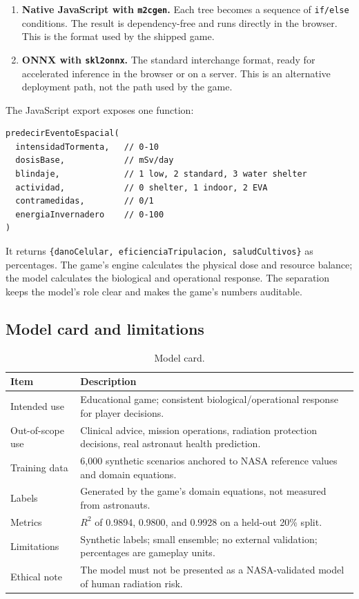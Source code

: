 \documentclass[11pt,a4paper]{article}
\newcommand{\code}[1]{\texttt{#1}}
\begin{document}
\begin{enumerate}
  \item \textbf{Native JavaScript with \code{m2cgen}.} Each tree becomes a sequence of \code{if/else} conditions. The result is dependency-free and runs directly in the browser. This is the format used by the shipped game.
  \item \textbf{ONNX with \code{skl2onnx}.} The standard interchange format, ready for accelerated inference in the browser or on a server. This is an alternative deployment path, not the path used by the game.
\end{enumerate}

The JavaScript export exposes one function:

\begin{verbatim}
predecirEventoEspacial(
  intensidadTormenta,   // 0-10
  dosisBase,            // mSv/day
  blindaje,             // 1 low, 2 standard, 3 water shelter
  actividad,            // 0 shelter, 1 indoor, 2 EVA
  contramedidas,        // 0/1
  energiaInvernadero    // 0-100
)
\end{verbatim}

It returns \code{\{danoCelular, eficienciaTripulacion, saludCultivos\}} as percentages. The game's engine calculates the physical dose and resource balance; the model calculates the biological and operational response. The separation keeps the model's role clear and makes the game's numbers auditable.

\subsection{Model card and limitations}

\begin{table}[H]
\centering
\small
\begin{tabular}{@{}p{4.2cm}p{10.2cm}@{}}
\toprule
\textbf{Item} & \textbf{Description}\\
\midrule
Intended use & Educational game; consistent biological/operational response for player decisions.\\
Out-of-scope use & Clinical advice, mission operations, radiation protection decisions, real astronaut health prediction.\\
Training data & 6,000 synthetic scenarios anchored to NASA reference values and domain equations.\\
Labels & Generated by the game's domain equations, not measured from astronauts.\\
Metrics & $R^2$ of 0.9894, 0.9800, and 0.9928 on a held-out 20\% split.\\
Limitations & Synthetic labels; small ensemble; no external validation; percentages are gameplay units.\\
Ethical note & The model must not be presented as a NASA-validated model of human radiation risk.\\
\bottomrule
\end{tabular}
\caption{Model card.}
\label{tab:model-card}
\end{table}
\end{document}
